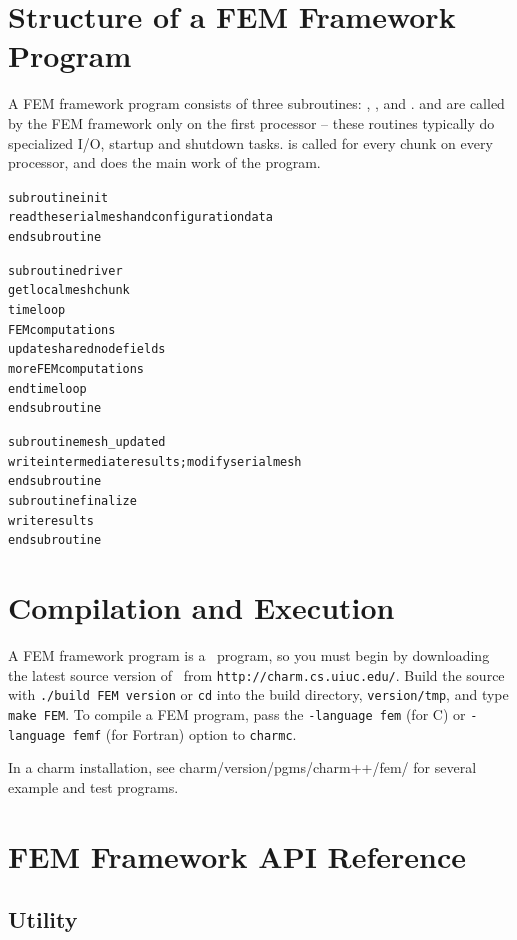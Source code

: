 \documentclass[10pt]{article}
\begin{document}
\section{Structure of a FEM Framework Program}

A FEM framework program consists of three subroutines: , ,
and .   and  are called by the FEM framework
only on the first processor -- these routines typically do specialized I/O,
startup and shutdown tasks.   is called for every chunk on every
processor, and does the main work of the program.

\begin{alltt}
     subroutine init
          read the serial mesh and configuration data
     end subroutine

     subroutine driver
          get local mesh chunk
          time loop
               FEM computations
               update shared node fields
               more FEM computations
          end time loop
     end subroutine

     subroutine mesh_updated
          write intermediate results; modify serial mesh
     end subroutine
     subroutine finalize
           write results
     end subroutine
\end{alltt}

\section{Compilation and Execution}

A FEM framework program is a \charmpp\ program, so you must begin by
downloading the latest source version of \charmpp\ from
{\tt http://charm.cs.uiuc.edu/}.  Build the source with 
{\tt ./build FEM version} or {\tt cd} into the build directory, 
{\tt version/tmp}, and type {\tt make FEM}.
To compile a FEM program, pass the {\tt -language fem} (for C) or 
{\tt -language femf} (for Fortran) option to {\tt charmc}.

In a charm installation, see charm/version/pgms/charm++/fem/
for several example and test programs.


\section{FEM Framework API Reference}

\subsection{Utility}
\end{document}
